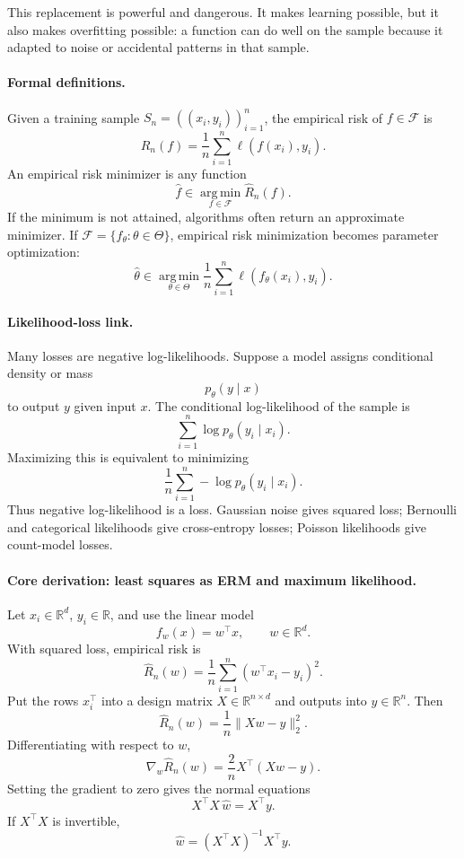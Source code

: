 This replacement is powerful and dangerous. It makes learning possible, but it also makes overfitting possible: a function can do well on the sample because it adapted to noise or accidental patterns in that sample.

\paragraph{Formal definitions.}
Given a training sample \(S_n=((x_i,y_i))_{i=1}^n\), the empirical risk of \(f\in\mathcal F\) is
\[
\boxed{
\widehat R_n(f)=\frac{1}{n}\sum_{i=1}^n \ell(f(x_i),y_i).
}
\]
An empirical risk minimizer is any function
\[
\boxed{
\widehat f\in\operatorname*{arg\,min}_{f\in\mathcal F}\widehat R_n(f).
}
\]
If the minimum is not attained, algorithms often return an approximate minimizer. If \(\mathcal F=\{f_\theta:\theta\in\Theta\}\), empirical risk minimization becomes parameter optimization:
\[
\widehat \theta\in\operatorname*{arg\,min}_{\theta\in\Theta}
\frac{1}{n}\sum_{i=1}^n \ell(f_\theta(x_i),y_i).
\]

\paragraph{Likelihood-loss link.}
Many losses are negative log-likelihoods. Suppose a model assigns conditional density or mass
\[
p_\theta(y\mid x)
\]
to output \(y\) given input \(x\). The conditional log-likelihood of the sample is
\[
\sum_{i=1}^n \log p_\theta(y_i\mid x_i).
\]
Maximizing this is equivalent to minimizing
\[
\frac{1}{n}\sum_{i=1}^n -\log p_\theta(y_i\mid x_i).
\]
Thus negative log-likelihood is a loss. Gaussian noise gives squared loss; Bernoulli and categorical likelihoods give cross-entropy losses; Poisson likelihoods give count-model losses.

\paragraph{Core derivation: least squares as ERM and maximum likelihood.}
Let \(x_i\in\mathbb R^d\), \(y_i\in\mathbb R\), and use the linear model
\[
f_w(x)=w^\top x,\qquad w\in\mathbb R^d.
\]
With squared loss, empirical risk is
\[
\widehat R_n(w)=\frac{1}{n}\sum_{i=1}^n (w^\top x_i-y_i)^2.
\]
Put the rows \(x_i^\top\) into a design matrix \(X\in\mathbb R^{n\times d}\) and outputs into \(y\in\mathbb R^n\). Then
\[
\widehat R_n(w)=\frac{1}{n}\|Xw-y\|_2^2.
\]
Differentiating with respect to \(w\),
\[
\nabla_w \widehat R_n(w)=\frac{2}{n}X^\top(Xw-y).
\]
Setting the gradient to zero gives the normal equations
\[
\boxed{X^\top X\,\widehat w=X^\top y.}
\]
If \(X^\top X\) is invertible,
\[
\widehat w=(X^\top X)^{-1}X^\top y.
\]

